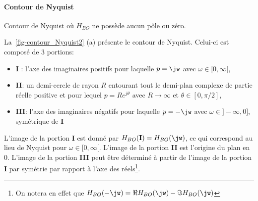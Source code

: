 \paragraph{Contour de Nyquist}
\begin{marginfigure}
    \centering
    
    \caption{Contour de Nyquist où $H_{BO}$ ne possède aucun pôle ou zéro.
    \label{fig-contour_Nyquist2}}
\end{marginfigure}
La~\cref{fig-contour_Nyquist2} (a) présente le contour de Nyquist. Celui-ci est 
composé de 3 portions:
\begin{itemize}
    \item \textbf{I} : l'axe des imaginaires positifs pour laquelle $p=\jw$ 
          avec $\omega\in[0,\infty[$,
    \item \textbf{II}: un demi-cercle de rayon $R$ entourant tout le 
          demi-plan complexe de partie réelle positive et pour lequel 
          $p=Re^{j\theta}$ avec $R\rightarrow\infty$ et $\theta\in[0,\pi/2]$,
    \item \textbf{III}: l'axe des imaginaires négatifs  pour laquelle $p=-\jw$ 
          avec $\omega\in]-\infty,0]$, symétrique de \textbf{I}
\end{itemize}
L'image de la portion \textbf{I} est donné par 
$H_{BO}(\boldsymbol{\mathrm{I}})=H_{BO}(\jw)$, ce qui correspond au lieu de 
Nyquist pour $\omega\in[0,\infty[$. L'image de la portion \textbf{II} est 
l'origine du plan en 0. L'image de la portion \textbf{III} peut être 
déterminé à partir de l'image de la portion \textbf{I} par symétrie par 
rapport à l'axe des réels\footnote{On notera en effet que 
$H_{BO}(-\jw)=\Re{H_{BO}(\jw)}-\Im{H_{BO}(\jw)}$}.

